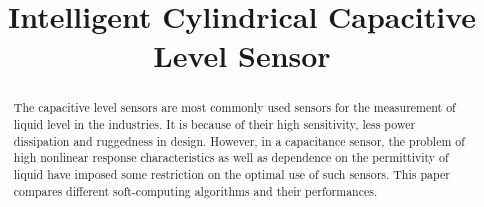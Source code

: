 \documentclass[conference]{IEEEtran}
\begin{document}
%
\title{Intelligent Cylindrical Capacitive Level Sensor }


\author{
\and
{}
}

\maketitle

\begin{abstract}
The  capacitive  level  sensors  are  most  commonly  used  sensors  for  the  measurement  of  liquid level in  the  industries. It  is  because  of  their  high  sensitivity,  less  power  dissipation  and ruggedness in design. However, in a capacitance sensor, the problem of high nonlinear response characteristics as well as dependence on the permittivity of liquid have imposed some restriction on the optimal use of such sensors. This paper compares different soft-computing algorithms and their performances. 

\end{abstract}





%
\IEEEpeerreviewmaketitle
\end{document}
